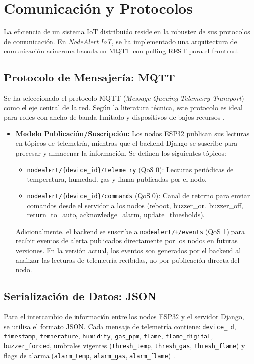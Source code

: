 \documentclass[11pt,a4paper]{article}
\begin{document}
\section{Comunicación y Protocolos}

La eficiencia de un sistema IoT distribuido reside en la robustez de sus protocolos de comunicación. En \textit{NodeAlert IoT}, se ha implementado una arquitectura de comunicación asíncrona basada en MQTT con polling REST para el frontend.

\subsection{Protocolo de Mensajería: MQTT}
Se ha seleccionado el protocolo MQTT (\textit{Message Queuing Telemetry Transport}) como el eje central de la red. Según la literatura técnica, este protocolo es ideal para redes con ancho de banda limitado y dispositivos de bajos recursos \citep{valvano2014volume2}.

\begin{itemize}
    \item \textbf{Modelo Publicación/Suscripción:} Los nodos ESP32 publican sus lecturas en tópicos de telemetría, mientras que el backend Django se suscribe para procesar y almacenar la información. Se definen los siguientes tópicos:
    \begin{itemize}
        \item \texttt{nodealert/\{device\_id\}/telemetry} (QoS 0): Lecturas periódicas de temperatura, humedad, gas y flama publicadas por el nodo.
        \item \texttt{nodealert/\{device\_id\}/commands} (QoS 0): Canal de retorno para enviar comandos desde el servidor a los nodos (reboot, buzzer\_on, buzzer\_off, return\_to\_auto, acknowledge\_alarm, update\_thresholds).
    \end{itemize}
Adicionalmente, el backend se suscribe a \texttt{nodealert/+/events} (QoS 1) para recibir eventos de alerta publicados directamente por los nodos en futuras versiones. En la versión actual, los eventos son generados por el backend al analizar las lecturas de telemetría recibidas, no por publicación directa del nodo.
\end{itemize}

\subsection{Serialización de Datos: JSON}
Para el intercambio de información entre los nodos ESP32 y el servidor Django, se utiliza el formato JSON. Cada mensaje de telemetría contiene: \texttt{device\_id}, \texttt{timestamp}, \texttt{temperature}, \texttt{humidity}, \texttt{gas\_ppm}, \texttt{flame}, \texttt{flame\_digital}, \texttt{buzzer\_forced}, umbrales vigentes (\texttt{thresh\_temp}, \texttt{thresh\_gas}, \texttt{thresh\_flame}) y flags de alarma (\texttt{alarm\_temp}, \texttt{alarm\_gas}, \texttt{alarm\_flame}) \citep{deitel2004}.
\end{document}
